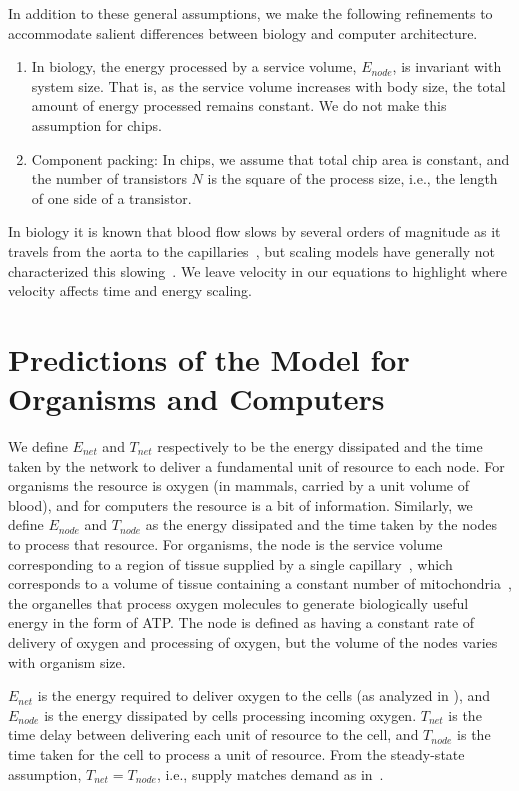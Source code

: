 \documentclass[12pt]{article}
\begin{document}
In addition to these general assumptions, we make the following
refinements to accommodate salient differences between biology and computer architecture.
\begin{enumerate}
\item In biology, the energy processed by a service volume,
  $E_{node}$, is invariant with system size. That is, as the service volume
  increases with body size, the total amount of energy processed
  remains constant.   We do not make this assumption for chips.

\item Component packing: In chips, we assume that total chip area is constant, and the
  number of transistors $N$ is the square of the process size, i.e.,
  the length of one side of a transistor. 

\end{enumerate}

\noindent 

In biology it is known that blood flow slows by several orders of magnitude as
it travels from the aorta to the capillaries~\cite{west97}, but scaling models
have generally not characterized this slowing~\cite{west97, banavar10}. We leave velocity in
our equations to highlight where velocity affects time and energy
scaling.

\section{Predictions of the Model for Organisms and Computers}

We define $E_{net}$ and $T_{net}$ respectively to be the energy dissipated and
the time taken by the network to deliver a fundamental unit of resource to each node.  For
organisms the resource is oxygen (in mammals, carried by a unit volume of
blood), and for computers the resource is a bit of information.
Similarly, we define $E_{node}$ and $T_{node}$ as the energy dissipated and the
time taken by the nodes to process that resource.  For organisms, the node is
the service volume corresponding to a region of tissue supplied by a single
capillary~\cite{banavar10}, which corresponds to a volume of tissue containing a constant number
of mitochondria~\cite{west2002allometric}, the organelles that process oxygen molecules to generate
biologically useful energy in the form of ATP.  The node is defined as having a constant
rate of delivery of oxygen and processing of oxygen, but the
volume of the nodes varies with organism size. 

$E_{net}$ is the energy required to deliver oxygen to the cells (as analyzed in
\cite{west97}), and $E_{node}$ is the energy dissipated by cells processing
incoming oxygen. $T_{net}$ is the time delay between delivering
each unit of resource to the cell, and $T_{node}$ is the time taken
for the cell to process a unit of resource. From the steady-state assumption, $T_{net} = T_{node}$,
i.e., supply matches demand as in~\cite{banavar10}.
\end{document}
